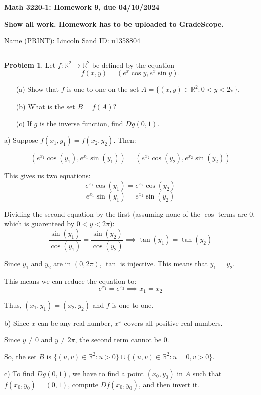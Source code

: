 \documentclass[12]{amsart}
\theoremstyle{definition}
\newtheorem{xca}{Problem}
\newcommand{\R}{\mathbb{R}}
\begin{document}
\centerline{ \bf Math 3220-1: Homework 9, due 04/10/2024}
\bigskip
\centerline{ \bf Show all work. Homework has to be uploaded to GradeScope.}
\bigskip
\noindent Name (PRINT): Lincoln Sand\hskip 2.5in ID: u1358804
\smallskip

\hrule

\bigskip



\begin{xca} %
Let $f:\R^2\to\R^2$ be defined by the equation
$$
f(x,y)=(e^x\cos{y}, e^x\sin{y}).
$$
\begin{itemize}
\item [(a)] Show that $f$ is one-to-one on the set $A=\{(x,y)\in\R^2: 0<y<2\pi\}.$
\smallskip
\item[(b)]What is the set $B=f(A)$?
\smallskip
\item[(c)] If $g$ is the inverse function, find $Dg(0,1)$.
\end{itemize}
\end{xca}


a) Suppose $f(x_1, y_1) = f(x_2, y_2)$. Then:

\[(e^{x_1} \cos(y_1), e^{x_1} \sin(y_1)) = (e^{x_2} \cos(y_2), e^{x_2} \sin(y_2))\]

This gives us two equations:
\[e^{x_1} \cos(y_1) = e^{x_2} \cos(y_2)\]
\[e^{x_1} \sin(y_1) = e^{x_2} \sin(y_2)\]

Dividing the second equation by the first (assuming none of the $\cos$ terms
are $0$, which is guarenteed by $0 < y < 2 \pi$):
\[\frac{\sin(y_1)}{\cos(y_1)} = \frac{\sin(y_2)}{\cos(y_2)} \implies \tan(y_1) = \tan(y_2)\]

Since $y_1$ and $y_2$ are in $(0, 2 \pi)$, $\tan$ is injective. This means that
$y_1$ = $y_2$.

This means we can reduce the equation to:
\[e^{x_1} = e^{x_2} \implies x_1 = x_2\]

Thus, $(x_1, y_1) = (x_2, y_2)$ and $f$ is one-to-one.

b) Since $x$ can be any real number, $x^{x}$ covers all positive real numbers.

Since $y \neq 0$ and $y \neq 2 \pi$, the second term cannot be $0$.

So, the set $B$ is $\{(u, v) \in \R^2 : u > 0\} \cup \{(u, v) \in \R^2 : u = 0, v > 0\}$.

c) To find $Dg(0, 1)$, we have to find a point $(x_0, y_0)$ in $A$ such that
$f(x_0, y_0) = (0, 1)$, compute $Df(x_0, y_0)$, and then invert it.
\end{document}
